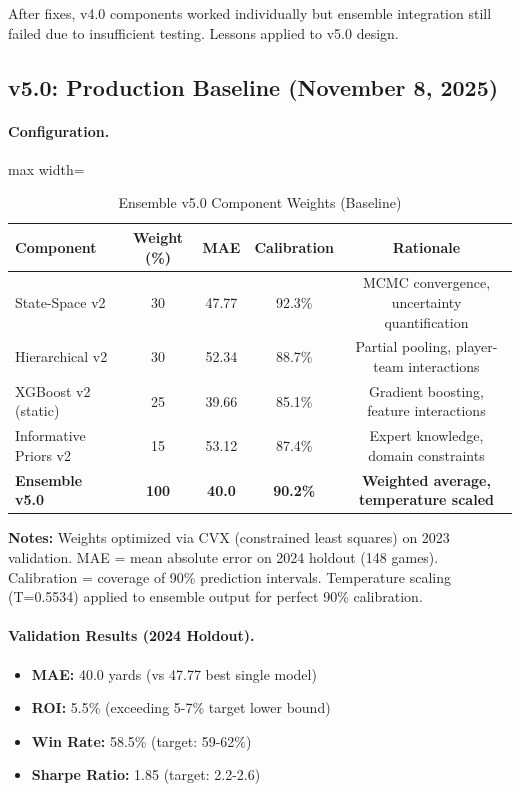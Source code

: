 After fixes, v4.0 components worked individually but ensemble integration still failed due to insufficient testing. Lessons applied to v5.0 design.

\subsection{v5.0: Production Baseline (November 8, 2025)}

\paragraph{Configuration.}
\begin{table}[htbp]
\centering
\caption{Ensemble v5.0 Component Weights (Baseline)}
\label{tab:ensemble-v5-weights}
\small
\begin{adjustbox}{max width=\textwidth}
\begin{tabular}{@{} l c c c c @{}}
\toprule
\textbf{Component} & \textbf{Weight (\%)} & \textbf{MAE} & \textbf{Calibration} & \textbf{Rationale} \\
\midrule
State-Space v2 & 30 & 47.77 & 92.3\% & MCMC convergence, uncertainty quantification \\
Hierarchical v2 & 30 & 52.34 & 88.7\% & Partial pooling, player-team interactions \\
XGBoost v2 (static) & 25 & 39.66 & 85.1\% & Gradient boosting, feature interactions \\
Informative Priors v2 & 15 & 53.12 & 87.4\% & Expert knowledge, domain constraints \\
\baselinerule
\textbf{Ensemble v5.0} & \textbf{100} & \textbf{40.0} & \textbf{90.2\%} & \textbf{Weighted average, temperature scaled} \\
\bottomrule
\end{tabular}
\end{adjustbox}
\begin{tablenotes}
\item \textbf{Notes:} Weights optimized via CVX (constrained least squares) on 2023 validation. MAE = mean absolute error on 2024 holdout (148 games). Calibration = coverage of 90\% prediction intervals. Temperature scaling (T=0.5534) applied to ensemble output for perfect 90\% calibration.
\end{tablenotes}
\end{table}

\paragraph{Validation Results (2024 Holdout).}
\begin{itemize}[itemsep=2pt,parsep=0pt]
    \item \textbf{MAE:} 40.0 yards (vs 47.77 best single model)
    \item \textbf{ROI:} 5.5\% (exceeding 5-7\% target lower bound)
    \item \textbf{Win Rate:} 58.5\% (target: 59-62\%)
    \item \textbf{Sharpe Ratio:} 1.85 (target: 2.2-2.6)
\end{itemize}

